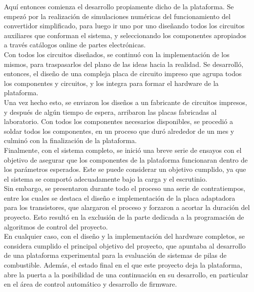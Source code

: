 Aquí entonces comienza el desarrollo propiamente dicho de la plataforma. Se empezó por la realización de simulaciones numéricas del funcionamiento del convertidor simplificado, para luego ir uno por uno diseñando todos los circuitos auxiliares que conforman el sistema, y seleccionando los componentes apropiados a través catálogos online de partes electrónicas.\\

Con todos los circuitos diseñados, se continuó con la implementación de los mismos, para traspasarlos del plano de las ideas hacia la realidad. Se desarrolló, entonces, el diseño de una compleja placa de circuito impreso que agrupa todos los componentes y circuitos, y los integra para formar el hardware de la plataforma.\\

Una vez hecho esto, se enviaron los diseños a un fabricante de circuitos impresos, y después de algún tiempo de espera, arribaron las placas fabricadas al laboratorio. Con todos los componentes necesarios disponibles, se procedió a soldar todos los componentes, en un proceso que duró alrededor de un mes y culminó con la finalización de la plataforma.\\

Finalmente, con el sistema completo, se inició una breve serie de ensayos con el objetivo de asegurar que los componentes de la plataforma funcionaran dentro de los parámetros esperados. Este se puede considerar un objetivo cumplido, ya que el sistema se comportó adecuadamente bajo la carga y el escrutinio.\\

Sin embargo, se presentaron durante todo el proceso una serie de contratiempos, entre los cuales se destaca el diseño e implementación de la placa adaptadora para los transistores, que alargaron el proceso y forzaron a acortar la duración del proyecto. Esto resultó en la exclusión de la parte dedicada a la  programación de algoritmos de control del proyecto.\\

En cualquier caso, con el diseño y la implementación del hardware completos, se considera cumplido el principal objetivo del proyecto, que apuntaba al desarrollo de una plataforma experimental para la evaluación de sistemas de pilas de combustible. Además, el estado final en el que este proyecto deja la plataforma, abre la puerta a la posibilidad de una continuación en su desarrollo, en particular en el área de control automático y desarrollo de firmware.\\

